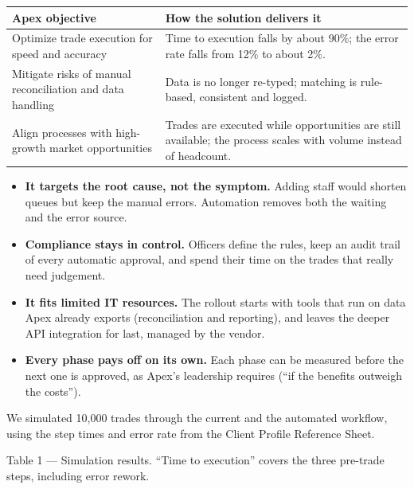 \documentclass[11pt]{article}
\let\oldsubheading\subheading
\renewcommand{\subheading}[1]{\Needspace{6\baselineskip}\oldsubheading{#1}}
\let\oldheading\heading
\renewcommand{\heading}[1]{\Needspace{8\baselineskip}\oldheading{#1}}
\begin{document}
\begin{center}
\small
\begin{tabular}{@{}p{5.2cm}p{10.6cm}@{}}
  \toprule
  \textbf{Apex objective} & \textbf{How the solution delivers it} \\
  \midrule
  Optimize trade execution for speed and accuracy & Time to execution falls by
    about 90\%; the error rate falls from 12\% to about 2\%. \\
  Mitigate risks of manual reconciliation and data handling & Data is no
    longer re-typed; matching is rule-based, consistent and logged. \\
  Align processes with high-growth market opportunities & Trades are executed
    while opportunities are still available; the process scales with volume
    instead of headcount. \\
  \bottomrule
\end{tabular}
\end{center}


\begin{itemize}[leftmargin=1.5em, itemsep=2pt]
  \item \textbf{It targets the root cause, not the symptom.} Adding staff
  would shorten queues but keep the manual errors. Automation removes both
  the waiting and the error source.
  \item \textbf{Compliance stays in control.} Officers define the rules, keep
  an audit trail of every automatic approval, and spend their time on the
  trades that really need judgement.
  \item \textbf{It fits limited IT resources.} The rollout starts with tools
  that run on data Apex already exports (reconciliation and reporting), and
  leaves the deeper API integration for last, managed by the vendor.
  \item \textbf{Every phase pays off on its own.} Each phase can be measured
  before the next one is approved, as Apex's leadership requires (``if the
  benefits outweigh the costs'').
\end{itemize}

We simulated 10,000 trades through the current and the automated workflow,
using the step times and error rate from the Client Profile Reference Sheet.

\begin{center}
  \small\par\smallskip
  {\color{gray}Table 1 --- Simulation results. ``Time to execution'' covers
  the three pre-trade steps, including error rework.}
\end{center}
\end{document}
